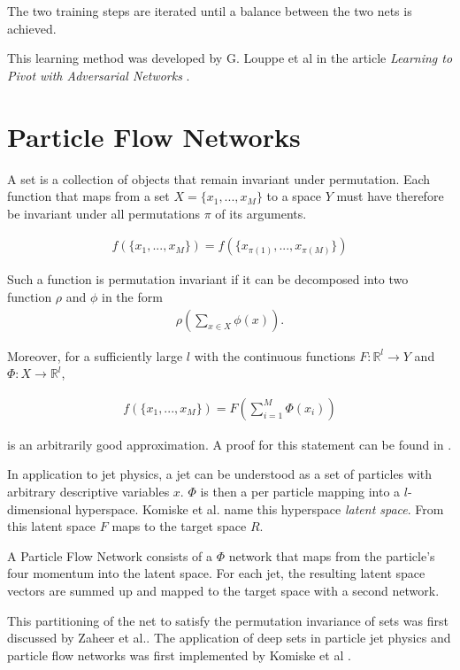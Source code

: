 \documentclass[12pt, a4paper]{thesis}
\begin{document}
The two training steps are iterated until a balance between the two nets is achieved.

This learning method was developed by G. Louppe et al in the
article \emph{Learning to Pivot with Adversarial Networks} \cite{louppe16_learn_to_pivot}.

\section{Particle Flow Networks}
\label{sec:orgde973b7}

A set is a collection of objects that remain invariant under permutation. Each function that maps from a set \(X = \{x_1, ... , x_M \}\) to a space \(Y\) must have
therefore be invariant under all permutations $\pi$ of its arguments.

\begin{align}
  f(\{x_1, ... , x_M \}) = f(\{x_{\pi(1)}, ... , x_{\pi(M)}\})
\end{align}

Such a function is permutation invariant if it can be decomposed into
two function $\rho$ and $\phi$ in the form
\begin{align}
  \rho \left(\sum_{x\in X} \phi(x)\right).  
\end{align}

Moreover, for a sufficiently large \(l\) with the continuous functions
\(F: \mathbb{R}^l \rightarrow Y\) and \(\Phi: X \rightarrow
\mathbb{R}^l\),

\begin{align}
  f(\{x_1, ... , x_M \}) = F(\sum_{i=1}^M \Phi(x_i))
\end{align}

is an arbitrarily good approximation. A proof for this statement can be
found in \cite{zaheer17_deep_sets}.

In application to jet physics, a jet can be understood as a set of
particles with arbitrary descriptive variables \(x\). \(\Phi\) is then
a per particle mapping into a \(l\)-dimensional hyperspace.  Komiske
et al. name this hyperspace \emph{latent space}. From this latent
space \(F\) maps to the target space \(R\).

A Particle Flow Network \cite{komiske19_energ_flow_networ} consists of
a \(\Phi\) network that maps from the particle's four momentum into
the latent space. For each jet, the resulting latent space vectors are
summed up and mapped to the target space with a second network.

This partitioning of the net to satisfy the permutation invariance of
sets was first discussed by Zaheer et
al.\cite{zaheer17_deep_sets}. The application of deep sets in particle
jet physics and particle flow networks was first implemented by
Komiske et al \cite{komiske19_energ_flow_networ}.
\end{document}
